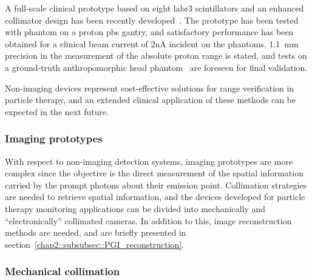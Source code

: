 A full-scale clinical prototype based on eight \gls{labr3} scintillators and an enhanced collimator design has been recently developed~\parencite{HuesoGonzalez2018}. The prototype has been tested with phantom on a proton \gls{pbs} gantry, and satisfactory performance has been obtained for a clinical beam current of 2nA incident on the phantoms. 1.1~mm precision in the measurement of the absolute proton range is stated, and tests on a ground-truth anthropomorphic head phantom~\parencite{Wohlfahrt2018} are foreseen for final validation.   

Non-imaging devices represent cost-effective solutions for range verification in particle therapy, and an extended clinical application of these methods can be expected in the next future. 

\subsubsection{Imaging prototypes}\label{chap2::subsec::PGdevices_Imaging}

With respect to non-imaging detection systems, imaging prototypes are more complex since the objective is the direct measurement of the spatial information carried by the prompt photons about their emission point. Collimation strategies are needed to retrieve spatial information, and the devices developed for particle therapy monitoring applications can be divided into mechanically and \enquote{electronically} collimated cameras. In addition to this, image reconstruction methods are needed, and are briefly presented in section~\ref{chap2::subsubsec::PGI_reconstruction}. 

\subsubsection{Mechanical collimation}\label{chap2::subsubsec::PGI_mechColl}

